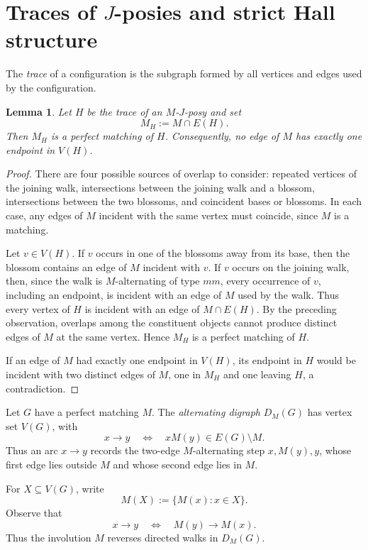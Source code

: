 \documentclass[preprint,12pt]{elsarticle}
\theoremstyle{plain}
\newtheorem{lemma}[theorem]{Lemma}
\begin{document}
\section{Traces of \(J\)-posies and strict Hall structure}
\label{sec_jposy_traces}

The \emph{trace} of a configuration is the subgraph formed by all vertices
and edges used by the configuration.

\begin{lemma}\label{lem_trace_perfect}
Let \(H\) be the trace of an \(M\)-\(J\)-posy and set
\[
M_H:=M\cap E(H).
\]
Then \(M_H\) is a perfect matching of \(H\). Consequently, no edge of \(M\)
has exactly one endpoint in \(V(H)\).
\end{lemma}

\begin{proof}
There are four possible sources of overlap to consider: repeated vertices
of the joining walk, intersections between the joining walk and a blossom,
intersections between the two blossoms, and coincident bases or blossoms.
In each case, any edges of \(M\) incident with the same vertex must
coincide, since \(M\) is a matching.

Let \(v\in V(H)\). If \(v\) occurs in one of the blossoms away from its
base, then the blossom contains an edge of \(M\) incident with \(v\).
If \(v\) occurs on the joining walk, then, since the walk is
\(M\)-alternating of type \(mm\), every occurrence of \(v\), including
an endpoint, is incident with an edge of \(M\) used by the walk.
Thus every vertex of \(H\) is incident with an edge of
\(M\cap E(H)\). By the preceding observation, overlaps among the
constituent objects cannot produce distinct edges of \(M\) at the same
vertex. Hence \(M_H\) is a perfect matching of \(H\).

If an edge of \(M\) had exactly one endpoint in \(V(H)\), its endpoint in
\(H\) would be incident with two distinct edges of \(M\), one in \(M_H\)
and one leaving \(H\), a contradiction.
\end{proof}

Let \(G\) have a perfect matching \(M\). The \emph{alternating digraph}
\(D_M(G)\) has vertex set \(V(G)\), with
\[
x\longrightarrow y
\quad\Longleftrightarrow\quad
xM(y)\in E(G)\setminus M.
\]
Thus an arc \(x\to y\) records the two-edge \(M\)-alternating step
\(x,M(y),y\), whose first edge lies outside \(M\) and whose second edge
lies in \(M\).

For \(X\subseteq V(G)\), write
\[
M(X):=\{M(x):x\in X\}.
\]
Observe that
\[
x\longrightarrow y
\quad\Longleftrightarrow\quad
M(y)\longrightarrow M(x).
\]
Thus the involution \(M\) reverses directed walks in \(D_M(G)\).
\end{document}
